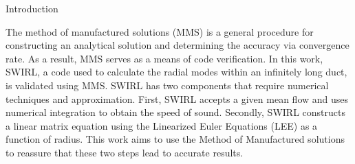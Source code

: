 Introduction

The method of manufactured solutions (MMS) is a general procedure for constructing an analytical solution and determining the accuracy via convergence rate. As a result, MMS serves as a means of code verification. In this work, SWIRL, a code used to calculate the radial modes within an infinitely long duct, is validated using MMS. SWIRL has two components that require numerical techniques and approximation. First, SWIRL accepts a given mean flow and uses numerical integration to obtain the speed of sound.  Secondly, SWIRL constructs a linear matrix equation using the Linearized Euler Equations (LEE) as a function of radius. This work aims to use the Method of Manufactured solutions to reassure that these two steps lead to accurate results.

